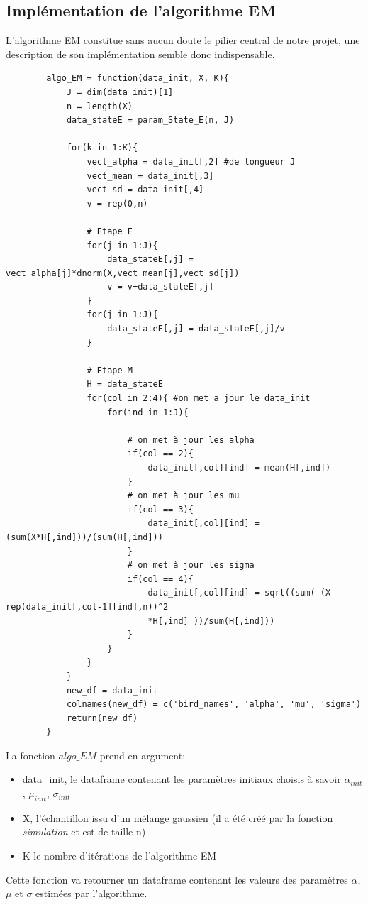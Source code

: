\documentclass[frenchb]{report}
\newcommand{\1}{\mathbbm{1}}
\theoremstyle{definition}\newtheorem{defn}{Définition}
\theoremstyle{definition}\newtheorem{exm}{Exemple}
\theoremstyle{definition}\newtheorem{nota}{Notation}
\theoremstyle{definition}\newtheorem{rem}{Remarque}
\begin{document}
\subsection{Implémentation de l'algorithme EM}
	L'algorithme EM constitue sans aucun doute le pilier central de notre projet, une description de son implémentation semble donc indispensable.
	\begin{lstlisting}
		algo_EM = function(data_init, X, K){
			J = dim(data_init)[1]
			n = length(X)
			data_stateE = param_State_E(n, J)
			
			for(k in 1:K){
				vect_alpha = data_init[,2] #de longueur J
				vect_mean = data_init[,3]
				vect_sd = data_init[,4]
				v = rep(0,n) 
				
				# Etape E
				for(j in 1:J){
					data_stateE[,j] = vect_alpha[j]*dnorm(X,vect_mean[j],vect_sd[j])
					v = v+data_stateE[,j]
				}
				for(j in 1:J){
					data_stateE[,j] = data_stateE[,j]/v
				}
				
				# Etape M
				H = data_stateE
				for(col in 2:4){ #on met a jour le data_init
					for(ind in 1:J){
						
						# on met à jour les alpha
						if(col == 2){
							data_init[,col][ind] = mean(H[,ind])
						}
						# on met à jour les mu
						if(col == 3){
							data_init[,col][ind] = (sum(X*H[,ind]))/(sum(H[,ind]))
						} 
						# on met à jour les sigma
						if(col == 4){
							data_init[,col][ind] = sqrt((sum( (X-rep(data_init[,col-1][ind],n))^2
							*H[,ind] ))/sum(H[,ind]))
						}
					}
				}
			}
			new_df = data_init
			colnames(new_df) = c('bird_names', 'alpha', 'mu', 'sigma')
			return(new_df)
		}
	\end{lstlisting}
	La fonction $algo\_EM$ prend en argument:
	\begin{itemize}
		\item data\_init, le dataframe contenant les paramètres initiaux choisis à savoir $\alpha_{init}$, $\mu_{init}$, $\sigma_{init}$ \\
		\item X, l'échantillon issu d'un mélange gaussien (il a été créé par la fonction \textit{simulation} et est de taille n)\\
		\item K le nombre d'itérations de l'algorithme EM
	\end{itemize}  
	Cette fonction va retourner un dataframe contenant les valeurs des
	paramètres $\alpha$, $\mu$ et $\sigma$ estimées par l'algorithme.
\end{document}
